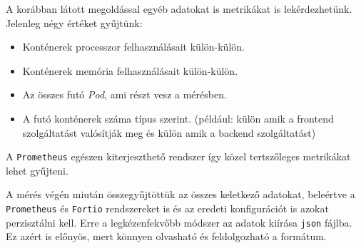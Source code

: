 

A korábban látott megoldással egyéb adatokat is metrikákat is lekérdezhetünk. Jelenleg négy értéket gyűjtünk:
\begin{itemize}
  \item Konténerek processzor felhasználásait külön-külön.
  \item Konténerek memória felhasználásait külön-külön.
  \item Az összes futó \textit{Pod}, ami részt vesz a mérésben.
  \item A futó konténerek száma típus szerint. (például: külön amik a frontend szolgáltatást valósítják meg és külön amik a backend szolgáltatást)
\end{itemize}

A \verb+Prometheus+ egészen kiterjeszthető rendszer így közel tertszőleges metrikákat lehet gyűjteni. 


A mérés végén miután összegyűjtöttük az összes keletkező adatokat, beleértve a \verb+Prometheus+ és \verb+Fortio+ rendszereket is és az eredeti konfigurációt is azokat perzisztálni kell. Erre a legkézenfekvőbb módszer az adatok kiírása \verb+json+ fájlba. Ez azért is előnyös, mert könnyen olvasható és feldolgozható a formátum. 